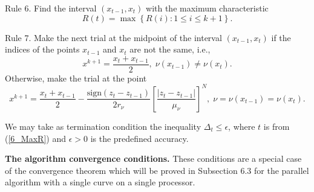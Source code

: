 Rule 6. Find the interval $(x_{t-1},x_t)$ with the maximum characteristic
\begin{equation}\label{6_MaxR}
R(t)=\max{\left\{R(i): 1 \leq i \leq k+1\right\}}.
\end{equation}

Rule 7. Make the next trial at the midpoint of the interval
$(x_{t-1},x_t)$ if the indices of the points $x_{t-1}$ and $x_t$  are not
the same, i.e.,
\[
x^{k+1} = \frac{x_t + x_{t-1}}{2}, \; \nu(x_{t-1}) \neq \nu(x_t).
\]
Otherwise, make the trial at the point
\begin{equation}%
x^{k+1} = \frac{x_t+x_{t-1}}{2} - \frac{\mathrm{sign}(z_t-z_{t-1})}{2r_\nu}\left[\frac{\left|z_t-z_{t-1}\right|}{\mu_\nu}\right]^N, \; \nu=\nu(x_{t-1})=\nu(x_t).
\end{equation}

We may take as termination condition the inequality $\Delta_t \leq
\epsilon$, where $t$ is from (\ref{6_MaxR}) and $\epsilon>0$ is the
predefined accuracy.

\textbf{The algorithm convergence conditions.} These conditions are a special case of the convergence theorem which will be proved in Subsection 6.3 for the parallel algorithm with a single curve on a single processor.

